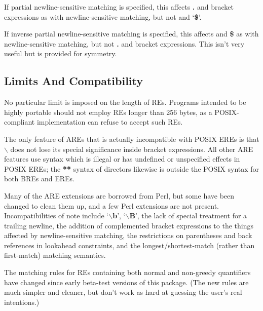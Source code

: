 If partial newline-sensitive matching is specified,
this affects {\bf .} and bracket expressions as with newline-sensitive matching,
but not {\bf \caret} and `{\bf \$}'. 

If inverse partial newline-sensitive matching is specified,
this affects {\bf \caret} and {\bf \$} as with newline-sensitive matching, but not {\bf .} and bracket
expressions. This isn't very useful but is provided for symmetry. 

\subsection{Limits And Compatibility}


No particular limit is imposed on the length of REs. Programs
intended to be highly portable should not employ REs longer than 256 bytes,
as a POSIX-compliant implementation can refuse to accept such REs. 

The only
feature of AREs that is actually incompatible with POSIX EREs is that {\bf $\backslash$}
does not lose its special significance inside bracket expressions. All other
ARE features use syntax which is illegal or has undefined or unspecified
effects in POSIX EREs; the {\bf ***} syntax of directors likewise is outside
the POSIX syntax for both BREs and EREs. 

Many of the ARE extensions are
borrowed from Perl, but some have been changed to clean them up, and a
few Perl extensions are not present. Incompatibilities of note include `{\bf $\backslash$b}',
`{\bf $\backslash$B}', the lack of special treatment for a trailing newline, the addition of
complemented bracket expressions to the things affected by newline-sensitive
matching, the restrictions on parentheses and back references in lookahead
constraints, and the longest/shortest-match (rather than first-match) matching
semantics. 

The matching rules for REs containing both normal and non-greedy
quantifiers have changed since early beta-test versions of this package.
(The new rules are much simpler and cleaner, but don't work as hard at guessing
the user's real intentions.) 

